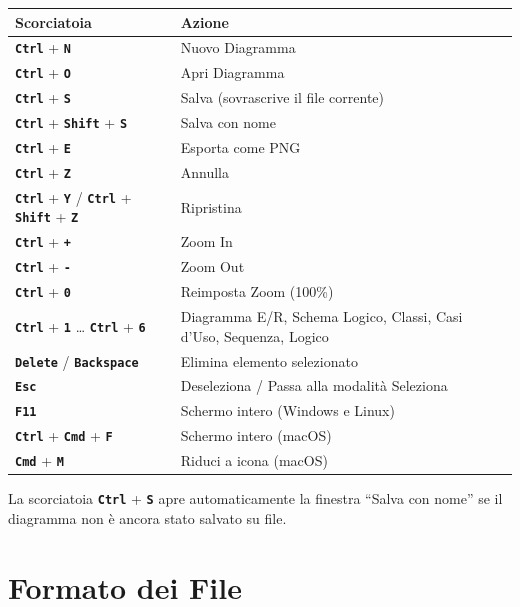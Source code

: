 \documentclass[a4paper,11pt]{article}
\newcommand{\key}[1]{\texttt{\textbf{#1}}}
\begin{document}
\begin{center}
\begin{tabular}{@{}l>{\raggedright\arraybackslash}p{7cm}@{}}
  \toprule
  \textbf{Scorciatoia} & \textbf{Azione} \\
  \midrule
  \key{Ctrl} + \key{N}           & Nuovo Diagramma \\
  \key{Ctrl} + \key{O}           & Apri Diagramma \\
  \key{Ctrl} + \key{S}           & Salva (sovrascrive il file corrente) \\
  \key{Ctrl} + \key{Shift} + \key{S} & Salva con nome \\
  \key{Ctrl} + \key{E}           & Esporta come PNG \\
  \key{Ctrl} + \key{Z}           & Annulla \\
  \key{Ctrl} + \key{Y} / \key{Ctrl} + \key{Shift} + \key{Z} & Ripristina \\
  \key{Ctrl} + \key{+}           & Zoom In \\
  \key{Ctrl} + \key{-}           & Zoom Out \\
  \key{Ctrl} + \key{0}           & Reimposta Zoom (100\%) \\
  \key{Ctrl} + \key{1} \ldots{} \key{Ctrl} + \key{6} & Diagramma E/R, Schema Logico, Classi, Casi d'Uso, Sequenza, Logico \\
  \key{Delete} / \key{Backspace} & Elimina elemento selezionato \\
  \key{Esc}                      & Deseleziona / Passa alla modalità Seleziona \\
  \key{F11}                      & Schermo intero (Windows e Linux) \\
  \key{Ctrl} + \key{Cmd} + \key{F} & Schermo intero (macOS) \\
  \key{Cmd} + \key{M}            & Riduci a icona (macOS) \\
  \bottomrule
\end{tabular}
\end{center}

\begin{tcolorbox}[notebox, title={Nota}]
  La scorciatoia \key{Ctrl} + \key{S} apre automaticamente la finestra ``Salva con nome''
  se il diagramma non è ancora stato salvato su file.
\end{tcolorbox}

\section{Formato dei File}
\label{sec:files}
\end{document}
